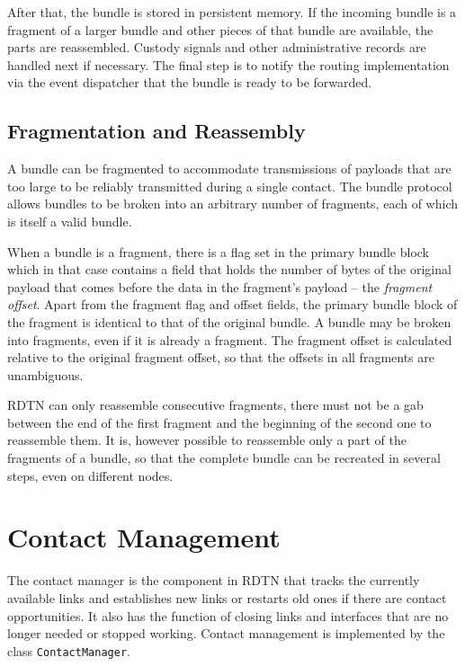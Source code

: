 \documentclass[a4paper]{article}
\begin{document}
After that, the bundle is stored in persistent memory. If the incoming
bundle is a fragment of a larger bundle and other pieces of that bundle are
available, the parts are reassembled. Custody signals and other
administrative records are handled next if necessary. The final step is to
notify the routing implementation via the event dispatcher that the bundle is
ready to be forwarded.

\subsection{Fragmentation and Reassembly}\label{sec.frag}

A bundle can be fragmented to accommodate transmissions of payloads that are too
large to be reliably transmitted during a single contact. The bundle protocol
allows bundles to be broken into an arbitrary number of fragments, each of which
is itself a valid bundle. 

When a bundle is a fragment, there is a flag set in the primary bundle block 
which in that case contains a field that holds the number of bytes of the
original payload that comes before the data in the fragment's payload -- the
{\em fragment offset}. Apart from the fragment flag and offset fields, the
primary bundle block of the fragment is identical to that of the original
bundle. A bundle may be broken into fragments, even if it is already a fragment.
The fragment offset is calculated relative to the original fragment offset, so
that the offsets in all fragments are unambiguous.

RDTN can only reassemble consecutive fragments, there must not be a gab
between the end of the first fragment and the beginning of the second one to
reassemble them. It is, however possible to reassemble only a part of the
fragments of a bundle, so that the complete bundle can be recreated in several
steps, even on different nodes.

\section{Contact Management}\label{sec.contact-mngt}

The contact manager is the component in RDTN that tracks the currently available
links and establishes new links or restarts old ones if there are contact
opportunities. It also has the function of closing links and
interfaces that are no longer needed or stopped working. Contact management is
implemented by the class {\tt ContactManager}.
\end{document}
